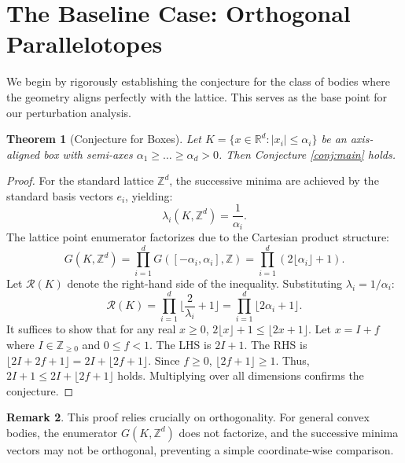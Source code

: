\documentclass[11pt, reqno]{amsart}
\newtheorem{theorem}{Theorem}
\theoremstyle{definition}
\newtheorem{remark}[theorem]{Remark}
\newcommand{\R}{\mathbb{R}}
\newcommand{\Z}{\mathbb{Z}}
\newcommand{\floor}[1]{\lfloor #1 \rfloor}
\begin{document}
\section{The Baseline Case: Orthogonal Parallelotopes}

We begin by rigorously establishing the conjecture for the class of bodies where the geometry aligns perfectly with the lattice. This serves as the base point for our perturbation analysis.

\begin{theorem}[Conjecture for Boxes] \label{thm:box}
Let $K = \{x \in \R^d : |x_i| \le \alpha_i \}$ be an axis-aligned box with semi-axes $\alpha_1 \ge \dots \ge \alpha_d > 0$. Then Conjecture \ref{conj:main} holds.
\end{theorem}

\begin{proof}
For the standard lattice $\Z^d$, the successive minima are achieved by the standard basis vectors $e_i$, yielding:
\begin{equation}
\lambda_i(K, \Z^d) = \frac{1}{\alpha_i}.
\end{equation}
The lattice point enumerator factorizes due to the Cartesian product structure:
\begin{equation}
G(K, \Z^d) = \prod_{i=1}^d G([-\alpha_i, \alpha_i], \Z) = \prod_{i=1}^d (2\floor{\alpha_i} + 1).
\end{equation}
Let $\mathcal{R}(K)$ denote the right-hand side of the inequality. Substituting $\lambda_i = 1/\alpha_i$:
\begin{equation}
\mathcal{R}(K) = \prod_{i=1}^d \floor{\frac{2}{\lambda_i} + 1} = \prod_{i=1}^d \floor{2\alpha_i + 1}.
\end{equation}
It suffices to show that for any real $x \ge 0$, $2\floor{x} + 1 \le \floor{2x + 1}$.
Let $x = I + f$ where $I \in \Z_{\ge 0}$ and $0 \le f < 1$.
The LHS is $2I + 1$. The RHS is $\floor{2I + 2f + 1} = 2I + \floor{2f + 1}$.
Since $f \ge 0$, $\floor{2f + 1} \ge 1$. Thus, $2I + 1 \le 2I + \floor{2f+1}$ holds.
Multiplying over all dimensions confirms the conjecture.
\end{proof}

\begin{remark}
This proof relies crucially on orthogonality. For general convex bodies, the enumerator $G(K, \Z^d)$ does not factorize, and the successive minima vectors may not be orthogonal, preventing a simple coordinate-wise comparison.
\end{remark}
\end{document}
